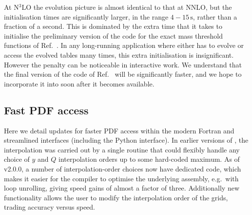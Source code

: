 At N$^3$LO the evolution picture is almost identical to that at NNLO,
but the initialisation times are significantly larger, in the range
$4-15\, \mathrm{s}$, rather than a fraction of a second.
%
This is dominated by the extra time that it takes to initialise the
preliminary version of the code for the exact mass threshold functions
of Ref.~\cite{BlumleinCode}.
%
In any long-running application where \hoppet either
has to evolve or access the evolved tables many times, this extra
initialisation is insignificant.
%
However the penalty can be noticeable in interactive work.
%
We understand that the final version of the code of
Ref.~\cite{BlumleinCode} will be significantly faster, and we hope to
incorporate it into \hoppet soon after it becomes available.



\subsection{Fast PDF access}
\label{sec:fastpdf}

Here we detail updates for faster PDF access within the
modern Fortran and streamlined interfaces (including the Python interface).
% 
%
In earlier versions of \hoppet, the interpolation was carried out by a
single routine that could flexibly handle any choice of $y$ and $Q$
interpolation orders up to some hard-coded maximum.
%
As of v2.0.0, a number of interpolation-order choices now have
dedicated code, which makes it easier for the compiler to optimise the
underlying assembly, e.g.\ with loop unrolling, giving speed gains of
almost a factor of three.
%
% 
Additionally new functionality allows the user to modify
the interpolation order of the \hoppet{} grids, trading accuracy
versus speed.




